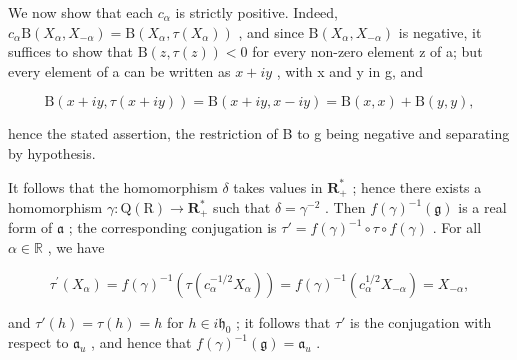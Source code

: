 We now show that each \(c_{\alpha}\) is strictly positive. Indeed, \(c_{\alpha}\mathrm{B}(X_{\alpha},X_{-\alpha})=\mathrm{B}(X_{\alpha},\tau(X_{\alpha}))\) , and since \(\mathrm{B}(X_{\alpha},X_{-\alpha})\) is negative, it suffices to show that \(\mathrm{B}(z,\tau(z))<0\) for every non-zero element z of a; but every element of a can be written as \(x+iy\) , with x and y in g, and

\[
\mathrm{B} (x + i y, \tau (x + i y)) = \mathrm{B} (x + i y, x - i y) = \mathrm{B} (x, x) + \mathrm{B} (y, y),
\]

hence the stated assertion, the restriction of B to g being negative and separating by hypothesis.

It follows that the homomorphism \(\delta\) takes values in \(\mathbf{R}_+^*\) ; hence there exists a homomorphism \(\gamma : \mathrm{Q}(\mathrm{R}) \to \mathbf{R}_+^*\) such that \(\delta = \gamma^{-2}\) . Then \(f(\gamma)^{-1}(\mathfrak{g})\) is a real form of \(\mathfrak{a}\) ; the corresponding conjugation is \(\tau' = f(\gamma)^{-1} \circ \tau \circ f(\gamma)\) . For all \(\alpha \in \mathbb{R}\) , we have

\[
\tau^ {\prime} (X _ {\alpha}) = f (\gamma) ^ {- 1} (\tau (c _ {\alpha} ^ {- 1 / 2} X _ {\alpha})) = f (\gamma) ^ {- 1} (c _ {\alpha} ^ {1 / 2} X _ {- \alpha}) = X _ {- \alpha},
\]

and \(\tau'(h) = \tau(h) = h\) for \(h \in i\mathfrak{h}_0\) ; it follows that \(\tau'\) is the conjugation with respect to \(\mathfrak{a}_u\) , and hence that \(f(\gamma)^{-1}(\mathfrak{g}) = \mathfrak{a}_u\) .

